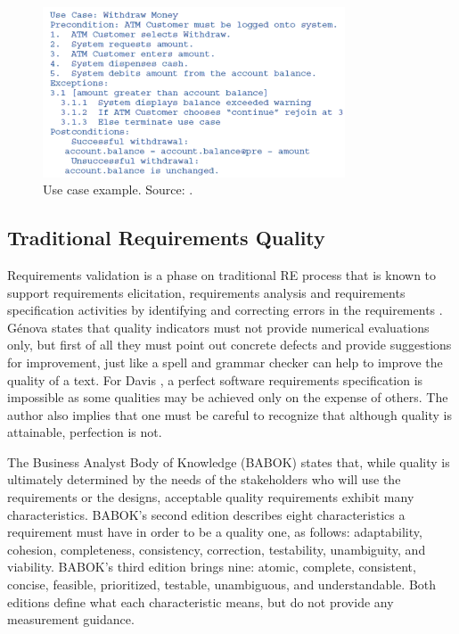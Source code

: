 \begin{figure}[t!]
\centering
\includegraphics[width=0.8\textwidth]{images/Use_Case_Example}
\caption{Use case example. Source: \cite{Williams_et_dot_al_2005}.}
\label{fig:use_case_example}
\end{figure}

\subsection{Traditional Requirements Quality}

Requirements validation is a phase on traditional RE process that is known to support requirements elicitation, requirements analysis and requirements specification activities by identifying and correcting errors in the requirements \cite{Heikkila_et_dot_al_2015}. G{\'e}nova \cite{Genova_2013} states that quality indicators must not provide numerical evaluations only, but first of all they must point out concrete defects and provide suggestions for improvement, just like a spell and grammar checker can help to improve the quality of a text. For Davis \cite{Davis_1993}, a perfect software requirements specification is impossible as some qualities may be achieved only on the expense of others. The author also implies that one must be careful to recognize that although quality is attainable, perfection is not.

The Business Analyst Body of Knowledge (BABOK) \cite{Babok_2015} states that, while quality is ultimately determined by the needs of the stakeholders who will use the requirements or the designs, acceptable quality requirements exhibit many characteristics. BABOK's second edition \cite{Babok_2009} describes eight characteristics a requirement must have in order to be a quality one, as follows: adaptability, cohesion, completeness, consistency, correction, testability, unambiguity, and viability. BABOK's third edition \cite{Babok_2015} brings nine: atomic, complete, consistent, concise, feasible, prioritized, testable, unambiguous, and understandable. Both editions \cite{Babok_2009}\cite{Babok_2015} define what each characteristic means, but do not provide any measurement guidance.


